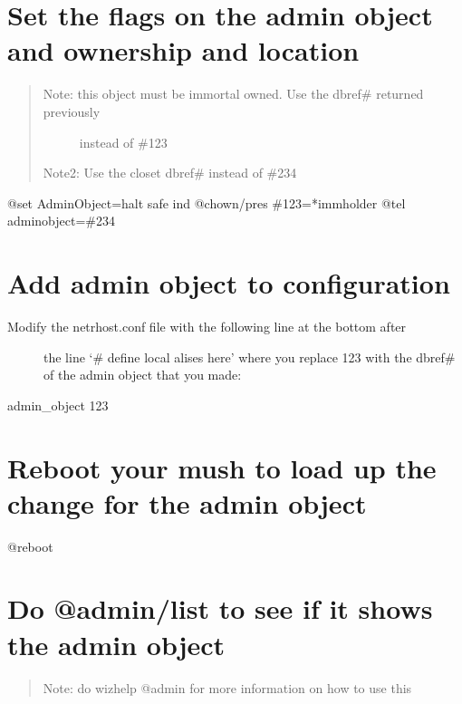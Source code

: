 \documentclass[letterpaper,10pt,english]{sphinxmanual}
\begin{document}
\section{Set the flags on the admin object and ownership and location}
\label{\detokenize{05-newmush:set-the-flags-on-the-admin-object-and-ownership-and-location}}\begin{quote}
\begin{description}
\item[{Note: this object must be immortal owned.  Use the dbref\# returned previously}] \leavevmode
\sphinxAtStartPar
instead of \#123

\end{description}

\sphinxAtStartPar
Note2: Use the closet dbref\# instead of \#234
\end{quote}

\sphinxAtStartPar
@set AdminObject=halt safe ind
@chown/pres \#123=*immholder
@tel adminobject=\#234


\section{Add admin object to configuration}
\label{\detokenize{05-newmush:add-admin-object-to-configuration}}\begin{description}
\item[{Modify the netrhost.conf file with the following line at the bottom after}] \leavevmode
\sphinxAtStartPar
the line ‘\# define local alises here’ where you replace 123 with the
dbref\# of the admin object that you made:

\end{description}

\sphinxAtStartPar
admin\_object 123


\section{Reboot your mush to load up the change for the admin object}
\label{\detokenize{05-newmush:reboot-your-mush-to-load-up-the-change-for-the-admin-object}}
\sphinxAtStartPar
@reboot


\section{Do @admin/list to see if it shows the admin object}
\label{\detokenize{05-newmush:do-admin-list-to-see-if-it-shows-the-admin-object}}\begin{quote}

\sphinxAtStartPar
Note: do wizhelp @admin for more information on how to use this
\end{quote}
\end{document}
